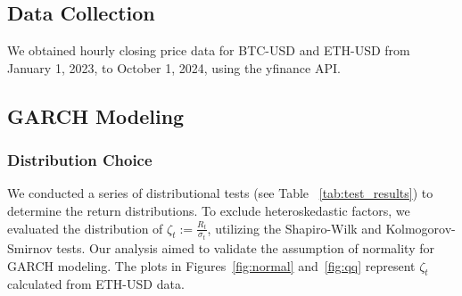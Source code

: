 \subsection{Data Collection}
We obtained hourly closing price data for BTC-USD and ETH-USD from January 1, 2023, to October 1, 2024, using the yfinance API.

\subsection{GARCH Modeling}
\label{sec:return_normolize}


\subsubsection{Distribution Choice}
We conducted a series of distributional tests (see Table ~\ref{tab:test_results}) to determine the return distributions. To exclude heteroskedastic factors, we evaluated the distribution of \(\zeta_t := \frac{R_t}{\sigma_t}\), utilizing the Shapiro-Wilk and Kolmogorov-Smirnov tests. Our analysis aimed to validate the assumption of normality for GARCH modeling. The plots in Figures~\ref{fig:normal} and~\ref{fig:qq} represent \(\zeta_t\) calculated from ETH-USD data.

